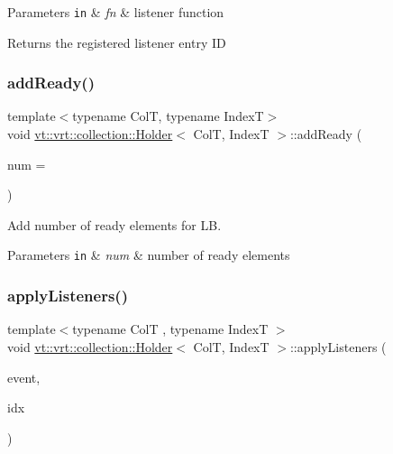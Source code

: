 \begin{DoxyParams}[1]{Parameters}
\mbox{\tt in}  & {\em fn} & listener function\\
\hline
\end{DoxyParams}
\begin{DoxyReturn}{Returns}
the registered listener entry ID 
\end{DoxyReturn}
\mbox{\label{structvt_1_1vrt_1_1collection_1_1_holder_ac41862395e0a1f6d0e68ebcd17c44824}} 
\subsubsection{\texorpdfstring{add\+Ready()}{addReady()}}
{\footnotesize\ttfamily template$<$typename ColT, typename IndexT$>$ \\
void \hyperlink{structvt_1_1vrt_1_1collection_1_1_holder}{vt\+::vrt\+::collection\+::\+Holder}$<$ ColT, IndexT $>$\+::add\+Ready (\begin{DoxyParamCaption}\item[{\hyperlink{structvt_1_1vrt_1_1collection_1_1_holder_a3251a556ac19fc7dc4d0bd388cfaedeb}{Count\+Type}}]{num = {} }\end{DoxyParamCaption})\hspace{0.3cm}{\ttfamily [inline]}}



Add number of ready elements for LB. 


\begin{DoxyParams}[1]{Parameters}
\mbox{\tt in}  & {\em num} & number of ready elements \\
\hline
\end{DoxyParams}
\mbox{\label{structvt_1_1vrt_1_1collection_1_1_holder_a3859f44089ed23d724782d5687343061}} 
\subsubsection{\texorpdfstring{apply\+Listeners()}{applyListeners()}}
{\footnotesize\ttfamily template$<$typename ColT , typename IndexT $>$ \\
void \hyperlink{structvt_1_1vrt_1_1collection_1_1_holder}{vt\+::vrt\+::collection\+::\+Holder}$<$ ColT, IndexT $>$\+::apply\+Listeners (\begin{DoxyParamCaption}\item[{\hyperlink{namespacevt_1_1vrt_1_1collection_1_1listener_a96ace4b58b3d91759e7abda5cc33b012}{listener\+::\+Element\+Event\+Enum}}]{event,  }\item[{IndexT const \&}]{idx }\end{DoxyParamCaption})}



